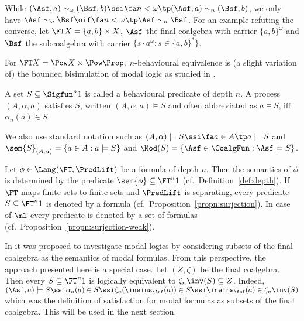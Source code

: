 \documentclass{entcs}
\begin{document}
\begin{remark}
  While $(\Asf,a)\sim_\omega(\Bsf,b) \ssi \fa n<\omega \tp
  (\Asf,a)\sim_n(\Bsf,b) $, we only have $\Asf\sim_\omega\Bsf \oif \fa
  n < \omega \tp \Asf\sim_n \Bsf$. For an example refuting the converse, let
  $\FT X=\{a,b\}\times X$, $\Asf$ the final coalgebra with carrier
  $\{a,b\}^\omega$ and $\Bsf$ the subcoalgebra with carrier $\{s\cdot
  a^\omega:s\in\{a,b\}^*\}$. 
\end{remark}

\begin{example}
  For $\FT X = \Pow X\times\Pow\Prop$, $n$-behavioural equivalence is
  (a slight variation of) the bounded bisimulation of modal logic as
  studied in \cite{gerbrandy:diss}.
\end{example}

\begin{defn}\label{def:predicates-depth-n}
  A set $S\subseteq \Sigfun^n 1$ is called a behavioural predicate of
  depth $n$. A process $(A,\alpha,a)$ satisfies $S$, written
  $(A,\alpha,a)\models S$ and often abbreviated as $a\models S$, iff
  $\alpha_n(a)\in S$.
\end{defn}

\noindent 
We also use standard notation such as $(A,\alpha)\models S\ssi \fa a\in A\tp
a\models S$ and $\sem{S}_{(A,\alpha)}=\{a\in A:a\models S\} $ and
$\Mod(S)=\{\Asf\in\CoalgFun:\Asf\models S\}$.

\begin{example}
  Let $\phi\in\Lang(\FT,\PredLift)$ be a formula of depth $n$. Then
  the semantics of $\phi$ is determined by the predicate
  $\sem{\phi}\subseteq\FT^n 1$ (cf.\ Definition~\ref{def:depth}).  If
  $\FT$ maps finite sets to finite sets and $\PredLift$ is separating,
  every predicate $S\subseteq\FT^n 1$ is denoted by a formula (cf.\ 
  Proposition~\ref{propn:surjection}). In case of $\ml$ every
  predicate is denoted by a set of formulas (cf.\ 
  Proposition~\ref{propn:surjection-weak}).
\end{example}

\begin{remark}
  In \cite{kurz:aiml98,kurz:diss} it was proposed to investigate modal
  logics by considering subsets of the final coalgebra as the
  semantics of modal formulas. From this perspective, the approach
  presented here is a special case. Let $(Z,\zeta)$ be the final
  coalgebra. Then every $S\subseteq\FT^n 1$ is logically equivalent to
  $\zeta_n\inv(S)\subseteq Z$. Indeed, $(\Asf,a)\models S \ssi
  \alpha_n(a)\in S \ssi \zeta_n(\ineins_\Asf(a))\in S \ssi
  \ineins_\Asf(a)\in\zeta_n\inv(S)$ which was the definition of
  satisfaction for modal formulas as subsets of the final coalgebra.
  This will be used in the next section.
\end{remark}
\end{document}
